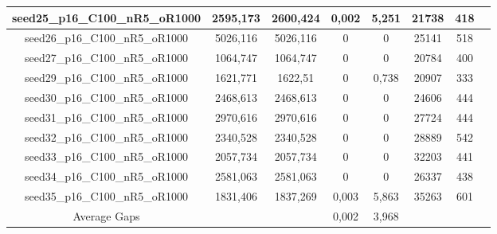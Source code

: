 \documentclass[a4paper]{article}
\begin{document}
\begin{center}
\begin{longtable}{cccccccc}
\hline
seed25\_p16\_C100\_nR5\_oR1000 & 2595,173 & 2600,424 & 0,002 & 5,251 & 21738 & 418\\
\hline
seed26\_p16\_C100\_nR5\_oR1000 & 5026,116 & 5026,116 & 0 & 0 & 25141 & 518\\
\hline
seed27\_p16\_C100\_nR5\_oR1000 & 1064,747 & 1064,747 & 0 & 0 & 20784 & 400\\
\hline
seed29\_p16\_C100\_nR5\_oR1000 & 1621,771 & 1622,51 & 0 & 0,738 & 20907 & 333\\
\hline
seed30\_p16\_C100\_nR5\_oR1000 & 2468,613 & 2468,613 & 0 & 0 & 24606 & 444\\
\hline
seed31\_p16\_C100\_nR5\_oR1000 & 2970,616 & 2970,616 & 0 & 0 & 27724 & 444\\
\hline
seed32\_p16\_C100\_nR5\_oR1000 & 2340,528 & 2340,528 & 0 & 0 & 28889 & 542\\
\hline
seed33\_p16\_C100\_nR5\_oR1000 & 2057,734 & 2057,734 & 0 & 0 & 32203 & 441\\
\hline
seed34\_p16\_C100\_nR5\_oR1000 & 2581,063 & 2581,063 & 0 & 0 & 26337 & 438\\
\hline
seed35\_p16\_C100\_nR5\_oR1000 & 1831,406 & 1837,269 & 0,003 & 5,863 & 35263 & 601\\
\hline
\hline
Average Gaps & & & 0,002 & 3,968 & & \\
\hline
\hline
\end{longtable}
\end{center}
\end{document}
